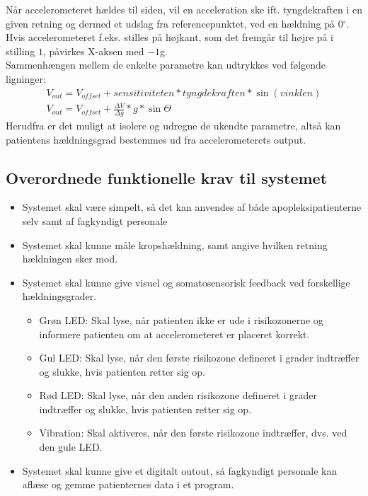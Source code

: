Når accelerometeret hældes til siden, vil en acceleration ske ift. tyngdekraften i en given retning og dermed et udslag fra referencepunktet, ved en hældning på 0$^{\circ}$. Hvis accelerometeret f.eks. stilles på højkant, som det fremgår til højre på  i stilling $1$, påvirkes X-aksen med $-1$g.\cite{Devices2009} \\
Sammenhængen mellem de enkelte parametre kan udtrykkes ved følgende ligninger: 
\begin{align}
	V_{out} = V_{offset} + sensitiviteten * tyngdekraften * \sin(vinklen) \\
	V_{out} = V_{offset} + \frac{\Delta V}{\Delta g} * g * \sin \Theta
\end{align}
Herudfra er det muligt at isolere og udregne de ukendte parametre, altså kan patientens hældningsgrad bestemmes ud fra accelerometerets output.

\subsection{Overordnede funktionelle krav til systemet}\label{FunkKrav}
\begin{itemize}
	\item Systemet skal være simpelt, så det kan anvendes af både apopleksipatienterne selv samt af fagkyndigt personale
	\item Systemet skal kunne måle kropshældning, samt angive hvilken retning hældningen sker mod. 
	\item Systemet skal kunne give visuel og somatosensorisk feedback ved forskellige hældningsgrader.
	\begin{itemize}
		\item Grøn LED: Skal lyse, når patienten ikke er ude i risikozonerne og informere patienten om at accelerometeret er placeret korrekt.  
		\item Gul LED: Skal lyse, når den første risikozone defineret i grader indtræffer og slukke, hvis patienten retter sig op.
		\item Rød LED: Skal lyse, når den anden risikozone defineret i grader indtræffer og slukke, hvis patienten retter sig op.
		\item Vibration: Skal aktiveres, når den første risikozone indtræffer, dvs. ved den gule LED.
	\end{itemize}
	\item Systemet skal kunne give et digitalt outout, så fagkyndigt personale kan aflæse og gemme patienternes data i et program.
\end{itemize}

